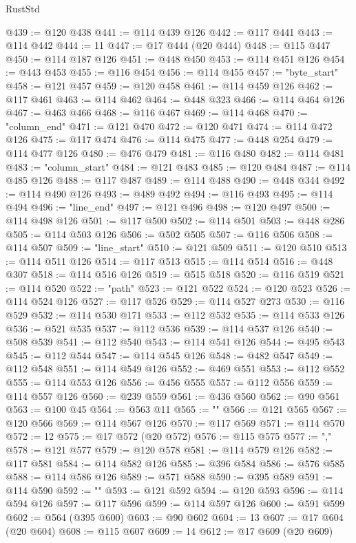\begin{lexlean}{RustStd}
\begin{coremodule}
{\begin{coremodule}
{{{{{{{{{{{{{{{{{{{{{{{{{{{{{{{{{{{{{{{{{{{{{{{{{{@439 := @120 @438
@441 := @114 @439 @126
@442 := @117 @441
@443 := @114 @442
@444 := 11
@447 := @17 @444 (@20 @444)
@448 := @115 @447
@450 := @114 @187 @126
@451 := @448 @450
@453 := @114 @451 @126
@454 := @443 @453
@455 := @116 @454
@456 := @114 @455
@457 := "byte_start"
@458 := @121 @457
@459 := @120 @458
@461 := @114 @459 @126
@462 := @117 @461
@463 := @114 @462
@464 := @448 @323
@466 := @114 @464 @126
@467 := @463 @466
@468 := @116 @467
@469 := @114 @468
@470 := "column_end"
@471 := @121 @470
@472 := @120 @471
@474 := @114 @472 @126
@475 := @117 @474
@476 := @114 @475
@477 := @448 @254
@479 := @114 @477 @126
@480 := @476 @479
@481 := @116 @480
@482 := @114 @481
@483 := "column_start"
@484 := @121 @483
@485 := @120 @484
@487 := @114 @485 @126
@488 := @117 @487
@489 := @114 @488
@490 := @448 @344
@492 := @114 @490 @126
@493 := @489 @492
@494 := @116 @493
@495 := @114 @494
@496 := "line_end"
@497 := @121 @496
@498 := @120 @497
@500 := @114 @498 @126
@501 := @117 @500
@502 := @114 @501
@503 := @448 @286
@505 := @114 @503 @126
@506 := @502 @505
@507 := @116 @506
@508 := @114 @507
@509 := "line_start"
@510 := @121 @509
@511 := @120 @510
@513 := @114 @511 @126
@514 := @117 @513
@515 := @114 @514
@516 := @448 @307
@518 := @114 @516 @126
@519 := @515 @518
@520 := @116 @519
@521 := @114 @520
@522 := "path"
@523 := @121 @522
@524 := @120 @523
@526 := @114 @524 @126
@527 := @117 @526
@529 := @114 @527 @273
@530 := @116 @529
@532 := @114 @530 @171
@533 := @112 @532
@535 := @114 @533 @126
@536 := @521 @535
@537 := @112 @536
@539 := @114 @537 @126
@540 := @508 @539
@541 := @112 @540
@543 := @114 @541 @126
@544 := @495 @543
@545 := @112 @544
@547 := @114 @545 @126
@548 := @482 @547
@549 := @112 @548
@551 := @114 @549 @126
@552 := @469 @551
@553 := @112 @552
@555 := @114 @553 @126
@556 := @456 @555
@557 := @112 @556
@559 := @114 @557 @126
@560 := @239 @559
@561 := @436 @560
@562 := @90 @561
@563 := @100 @45
@564 := @563 @11
@565 := "{"
@566 := @121 @565
@567 := @120 @566
@569 := @114 @567 @126
@570 := @117 @569
@571 := @114 @570
@572 := 12
@575 := @17 @572 (@20 @572)
@576 := @115 @575
@577 := ","
@578 := @121 @577
@579 := @120 @578
@581 := @114 @579 @126
@582 := @117 @581
@584 := @114 @582 @126
@585 := @396 @584
@586 := @576 @585
@588 := @114 @586 @126
@589 := @571 @588
@590 := @395 @589
@591 := @114 @590
@592 := "}"
@593 := @121 @592
@594 := @120 @593
@596 := @114 @594 @126
@597 := @117 @596
@599 := @114 @597 @126
@600 := @591 @599
@602 := @564 (@395 @600)
@603 := @90 @602
@604 := 13
@607 := @17 @604 (@20 @604)
@608 := @115 @607
@609 := 14
@612 := @17 @609 (@20 @609)
}}}}}}}}}}}}}}}}}}}}}}}}}}}}}}}}}}}}}}}}}}}}}}}}}}
\end{coremodule}}
\end{coremodule}
\end{lexlean}
